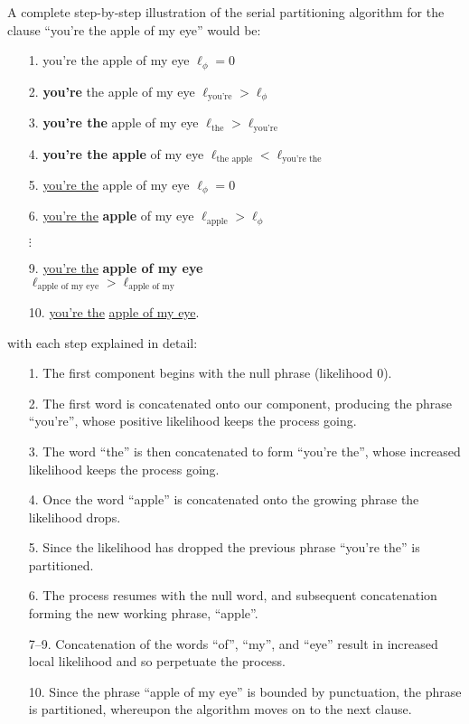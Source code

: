 A complete step-by-step illustration of the serial partitioning
algorithm  for the clause ``you're the apple of my eye'' would be:
\begin{itemize}
\item[1.] you're the apple of my eye \hfill $\ell_\phi=0$\\
\item[2.] \textbf{you're} the apple of my eye \hfill $\ell_{\text{you're}} > \ell_\phi$\\
\item[3.] \textbf{you're the} apple of my eye \hfill $\ell_{\text{the}} > \ell_{\text{you're}}$\\
\item[4.] \textbf{you're the apple} of my eye \hfill $\ell_{\text{the apple}} < \ell_{\text{you're the}}$\\
\item[5.] \underline{you're the} apple of my eye \hfill $\ell_\phi=0$\\
\item[6.] \underline{you're the} \textbf{apple} of my eye \hfill $\ell_{\text{apple}} > \ell_\phi$\\
\item[$\vdots$]
\item[9.] \underline{you're the} \textbf{apple of my eye} \\ \mbox{} \hfill $\ell_{\text{apple of my eye}} > \ell_{\text{apple of my}}$\\
\item[10.] \underline{you're the} \underline{apple of my eye}. \hfill\\
\end{itemize}      
with each step explained in detail:
\begin{enumerate}
\item[1.]
  The first component begins with the null phrase (likelihood 0).
\item[2.]        
  The first word is concatenated onto our component, producing the phrase ``you're'', whose positive likelihood keeps the process going.
\item[3.]
        The word ``the'' is then concatenated to form ``you're the'', whose increased likelihood keeps the process going.
\item[4.]
        Once the word ``apple'' is concatenated onto the growing phrase the likelihood drops.
\item[5.]
        Since the likelihood has dropped the previous phrase ``you're the'' is partitioned.           
\item[6.]
        The process resumes with the null word, and subsequent concatenation forming the new working phrase, ``apple''.
\item[7--9.]
        Concatenation of the words ``of'', ``my'', and ``eye'' result in increased local likelihood and so perpetuate the process.
\item[10.]
        Since the phrase ``apple of my eye'' is bounded by punctuation, the phrase is partitioned, whereupon the algorithm moves on to the next clause.
\end{enumerate}


